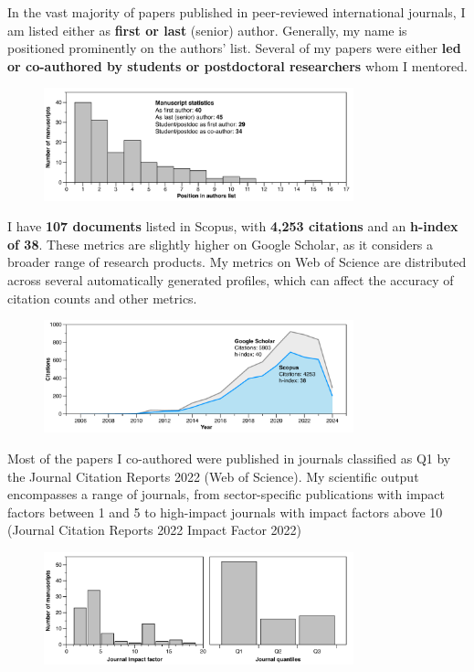 \documentclass[11pt]{article}
\begin{document}
{\normalfont In the vast majority of papers published in peer-reviewed international journals, I am listed either as \textbf{first or last} (senior) author. Generally, my name is positioned prominently on the authors' list. Several of my papers were either \textbf{led or co-authored by students or postdoctoral researchers} whom I mentored.}

\begin{figure}[h]
\centering
\includegraphics[width=0.8\textwidth]{img/Manuscripts.pdf}
\end{figure}

{\normalfont I have \textbf{107 documents} listed in Scopus, with \textbf{4,253 citations} and an \textbf{h-index of 38}. These metrics are slightly higher on Google Scholar, as it considers a broader range of research products. My metrics on Web of Science are distributed across several automatically generated profiles, which can affect the accuracy of citation counts and other metrics.}

\begin{figure}[h]
\centering
\includegraphics[width=0.8\textwidth]{img/CITATIONS.pdf}
\end{figure}

\newpage

{\normalfont Most of the papers I co-authored were published in journals classified as Q1 by the Journal Citation Reports 2022 (Web of Science). My scientific output encompasses a range of journals, from sector-specific publications with impact factors between 1 and 5 to high-impact journals with impact factors above 10 (Journal Citation Reports 2022 Impact Factor 2022)}

\begin{figure}[h]
\centering
\includegraphics[width=0.8\textwidth]{img/Quantiles.pdf}
\end{figure}
\end{document}

